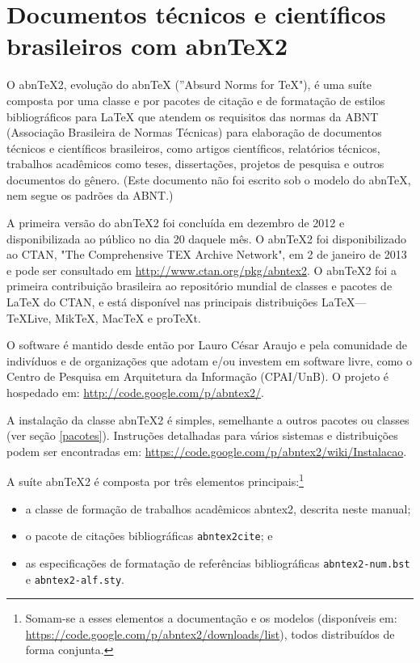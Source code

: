 \chapter{Documentos técnicos e científicos brasileiros com abnTeX2}

O abn\TeX 2, evolução do abn\TeX{} (''Absurd Norms for TeX"), é uma suíte composta por uma classe e por pacotes de citação e de formatação de estilos bibliográficos para \LaTeX{} que atendem os requisitos das normas da ABNT (Associação Brasileira de Normas Técnicas) para elaboração de documentos técnicos e científicos brasileiros, como artigos científicos, relatórios técnicos, trabalhos acadêmicos como teses, dissertações, projetos de pesquisa e outros documentos do gênero. (Este documento não foi escrito sob o modelo do abn\TeX, nem segue os
padrões da ABNT.)

A primeira versão do abnTeX2 foi concluída em dezembro de 2012 e disponibilizada ao público no dia 20 daquele mês. O abnTeX2 foi disponibilizado ao CTAN, "The Comprehensive TEX Archive Network", em 2 de janeiro de 2013 e pode ser consultado em \url{http://www.ctan.org/pkg/abntex2}. O abnTeX2 foi a primeira contribuição brasileira ao repositório mundial de classes e pacotes de LaTeX do CTAN, e está disponível nas principais distribuições \LaTeX --- \TeX Live, Mik\TeX, Mac\TeX{} e pro\TeX t. 

O software é mantido desde então por Lauro César Araujo e pela comunidade de indivíduos e de organizações que adotam e/ou investem em software livre, como o Centro de Pesquisa em Arquitetura da Informação (CPAI/UnB). O projeto é hospedado em: \url{http://code.google.com/p/abntex2/}. 

A instalação da classe abn\TeX 2 é simples, semelhante a outros pacotes ou classes (ver seção \ref{pacotes}). Instruções detalhadas para vários sistemas e distribuições podem ser encontradas em: \url{https://code.google.com/p/abntex2/wiki/Instalacao}.

A suíte abn\TeX 2 é composta por três elementos principais:\footnote{Somam-se a
esses elementos a documentação e os modelos (disponíveis em: \url{https://code.google.com/p/abntex2/downloads/list}), todos distribuídos de forma
conjunta.}

\begin{itemize}
  \item a classe de formação de trabalhos acadêmicos \textsf{abntex2}, descrita
  neste manual;
  \item o pacote de citações bibliográficas \texttt{abntex2cite}; e
  \item as especificações de formatação de referências bibliográficas
  \texttt{abntex2-num.bst} e \texttt{abntex2-alf.sty}.
\end{itemize}

